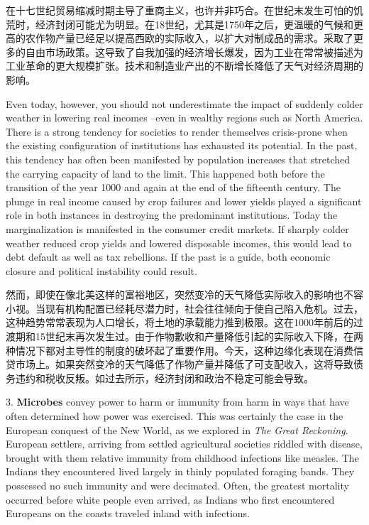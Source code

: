 \begin{Parallel}{97mm}{45mm}
  \ParallelRText
  {在十七世纪贸易缩减时期主导了重商主义，也许并非巧合。在世纪末发生可怕的饥荒时，经济封闭可能尤为明显。在18世纪，尤其是1750年之后，更温暖的气候和更高的农作物产量已经足以提高西欧的实际收入，以扩大对制成品的需求。采取了更多的自由市场政策。这导致了自我加强的经济增长爆发，因为工业在常常被描述为工业革命的更大规模扩张。技术和制造业产出的不断增长降低了天气对经济周期的影响。}
  \ParallelPar


  \ParallelLText
  {Even today, however, you should not underestimate the impact of suddenly colder weather in lowering real incomes --even in wealthy regions such as North America. There is a strong tendency for societies to render themselves crisis-prone when the existing configuration of institutions has exhausted its potential. In the past, this tendency has often been manifested by population increases that stretched the carrying capacity of land to the limit. This happened both before the transition of the year 1000 and again at the end of the fifteenth century. The plunge in real income caused by crop failures and lower yields played a significant role in both instances in destroying the predominant institutions. Today the marginalization is manifested in the consumer credit markets. If sharply colder weather reduced crop yields and lowered disposable incomes, this would lead to debt default as well as tax rebellions. If the past is a guide, both economic closure and political instability could result.}
  
  \ParallelRText
  {然而，即使在像北美这样的富裕地区，突然变冷的天气降低实际收入的影响也不容小视。当现有机构配置已经耗尽潜力时，社会往往倾向于使自己陷入危机。过去，这种趋势常常表现为人口增长，将土地的承载能力推到极限。这在1000年前后的过渡期和15世纪末再次发生过。由于作物歉收和产量降低引起的实际收入下降，在两种情况下都对主导性的制度的破坏起了重要作用。今天，这种边缘化表现在消费信贷市场上。如果突然变冷的天气降低了作物产量并降低了可支配收入，这将导致债务违约和税收反叛。如过去所示，经济封闭和政治不稳定可能会导致。}
  \ParallelPar


  \ParallelLText
  {3. \textbf{Microbes} convey power to harm or immunity from harm in ways that have often determined how power was exercised. This was certainly the case in the European conquest of the New World, as we explored in \emph{The Great Reckoning}. European settlers, arriving from settled agricultural societies riddled with disease, brought with them relative immunity from childhood infections like measles. The Indians they encountered lived largely in thinly populated foraging bands. They possessed no such immunity and were decimated. Often, the greatest mortality occurred before white people even arrived, as Indians who first encountered Europeans on the coasts traveled inland with infections.}
  

\end{Parallel}
